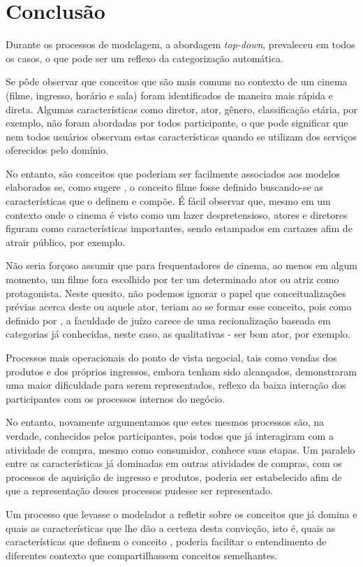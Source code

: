 \section{\hspace*{3pt} Conclusão}
\label{sec:conclusaoModeloConceitual}

Durante os processos de modelagem, a abordagem \textit{top-down}, prevaleceu em todos os casos, o que pode ser um reflexo da categorização automática. 

Se pôde observar que conceitos que são mais comuns no contexto de um cinema (filme, ingresso, horário e sala) foram identificados de maneira mais rápida e direta. Algumas características como diretor, ator, gênero, classificação etária, por exemplo, não foram abordadas por todos participante, o que pode significar que nem todos usuários observam estas características quando se utilizam dos serviços oferecidos pelo domínio.

No entanto, são conceitos que poderiam ser facilmente associados aos modelos elaborados se, como sugere , o conceito filme fosse definido buscando-se as características que o definem e compõe. É fácil observar que, mesmo em um contexto onde o cinema é visto como um lazer despretensioso, atores e diretores figuram como características importantes, sendo estampados em cartazes afim de atrair público, por exemplo. 

Não seria forçoso assumir que para frequentadores de cinema, ao menos em algum momento, um filme fora escolhido por ter um determinado ator ou atriz como protagonista. Neste quesito, não podemos ignorar o papel que conceitualizações prévias acerca deste ou aquele ator, teriam ao se formar esse conceito, pois como definido por , a faculdade de juízo carece de uma recionalização baseada em categorias já conhecidas, neste caso, as qualitativas - ser bom ator, por exemplo. 

Processos mais operacionais do ponto de vista negocial, tais como vendas dos produtos e dos próprios ingressos, embora tenham sido alcançados, demonstraram uma maior dificuldade para serem representados, reflexo da baixa interação dos participantes com os processos internos do negócio. 

No entanto, novamente argumentamos que estes mesmos processos são, na verdade, conhecidos pelos participantes, pois todos que já interagiram com a atividade de compra, mesmo como consumidor, conhece suas etapas. Um paralelo entre as características já dominadas em outras atividades de compras, com os processos de aquisição de ingresso e produtos, poderia ser estabelecido afim de que a representação desses processos pudesse ser representado. 

Um processo que levasse o modelador a refletir sobre os conceitos que já domina e quais as características que lhe dão a certeza desta convicção, isto é, quais as características que definem o conceito , poderia facilitar o entendimento de diferentes contexto que compartilhassem conceitos semelhantes.  